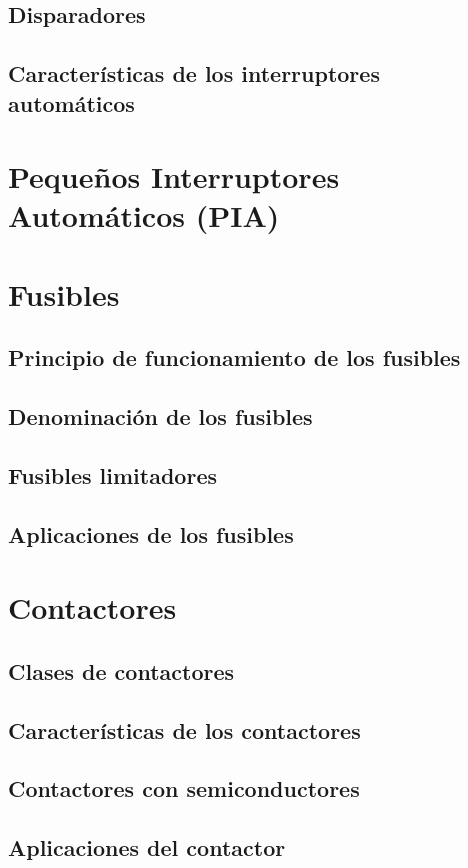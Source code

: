 \subsection{Disparadores}
\subsection{Características de los interruptores automáticos}

\section{Pequeños Interruptores Automáticos (PIA)}

\section{Fusibles}
\subsection{Principio de funcionamiento de los fusibles}
\subsection{Denominación de los fusibles}
\subsection{Fusibles limitadores}
\subsection{Aplicaciones de los fusibles}

\section{Contactores}
\subsection{Clases de contactores}
\subsection{Características de los contactores}
\subsection{Contactores con semiconductores}
\subsection{Aplicaciones del contactor}

